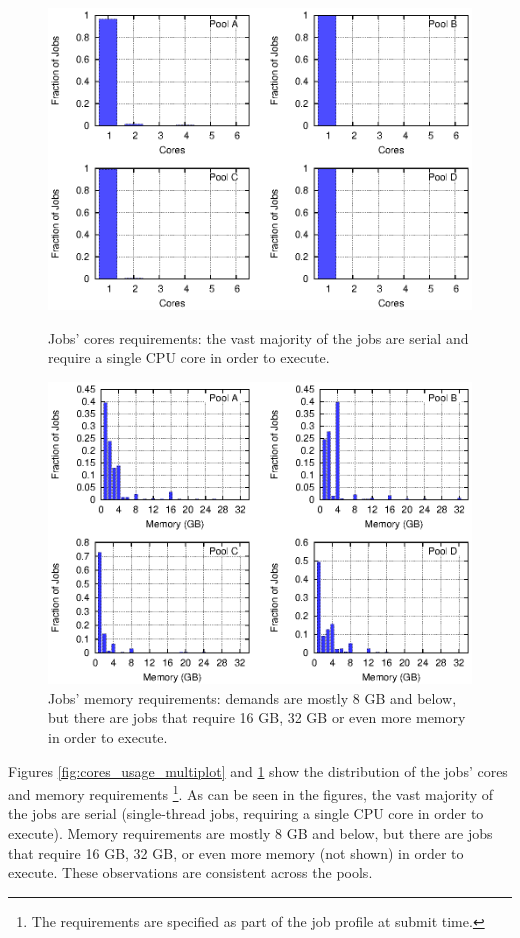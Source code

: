 \begin{figure}[p]\centering
	\includegraphics{figures/cores_multiplot.eps}
\caption{Jobs' cores requirements: the vast majority of the jobs are
  serial and require a single CPU core in order to execute.}
\label{fig:cores_usage_multiplot}
	\includegraphics{figures/memory_multiplot.eps}
\caption{Jobs' memory requirements: demands are mostly 8 GB and below,
  but there are jobs that require 16 GB, 32 GB or even more memory in
  order to execute.}
\label{fig:memory_usage_multiplot}
\end{figure}

Figures \ref{fig:cores_usage_multiplot} and \ref{fig:memory_usage_multiplot}
show the distribution of the jobs' cores and memory requirements
\footnote{The requirements are specified as part of the job profile at submit time.}.
As can be seen in the figures, the vast majority of the jobs are
serial (single-thread jobs, requiring a single CPU core in order to execute).
Memory requirements are mostly 8 GB and below, but there are jobs that
require 16 GB, 32 GB, or even more memory (not shown) in order to
execute.
These observations are consistent across the pools.



